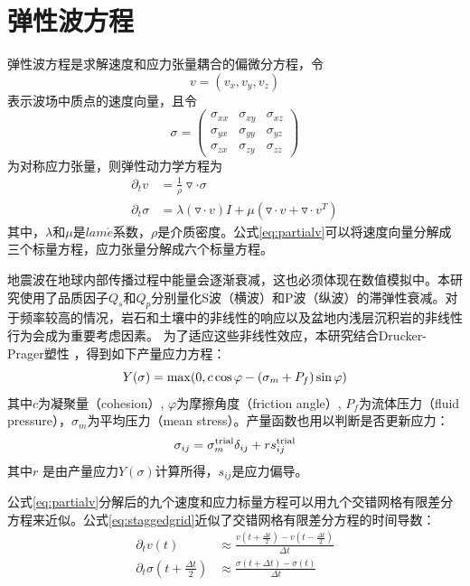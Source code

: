 \documentclass[degree=doctor]{thuthesis}
\begin{document}
\section{弹性波方程}
弹性波方程是求解速度和应力张量耦合的偏微分方程，令
\begin{equation}
  v = (v_x, v_y, v_z)
  \label{eq:vvvv}
\end{equation}
表示波场中质点的速度向量，且令
\begin{equation}
  \sigma = \begin{pmatrix}
\sigma_{xx} & \sigma_{xy} & \sigma_{xz} \\
\sigma_{yx} & \sigma_{yy} & \sigma_{yz} \\
\sigma_{zx} & \sigma_{zy} & \sigma_{zz}
\end{pmatrix}
\end{equation}
为对称应力张量，则弹性动力学方程为
\begin{equation}
\begin{aligned}
\partial _t v &= \frac{1}{\rho}\triangledown \cdot \sigma  \\
\partial _{t}\sigma &= \lambda(\triangledown \cdot v)I + \mu(\triangledown \cdot v + \triangledown \cdot v^T)
\end{aligned}
  \label{eq:partialv}
\end{equation}
其中，$\lambda$和$\mu$是$lam\acute{e}$系数，$\rho$是介质密度。公式\ref{eq:partialv}可以将速度向量分解成三个标量方程，应力张量分解成六个标量方程。

地震波在地球内部传播过程中能量会逐渐衰减，这也必须体现在数值模拟中。本研究使用了品质因子$Q_s$和$Q_p$分别量化S波（横波）和P波（纵波）的滞弹性衰减。对于频率较高的情况，岩石和土壤中的非线性的响应以及盆地内浅层沉积岩的非线性行为会成为重要考虑因素。 为了适应这些非线性效应，本研究结合Drucker-Prager塑性 \citep {roten2016high}，得到如下产量应力方程：
\begin{equation}
Y(\sigma)={\rm max}(0, c \cos \varphi - ( \sigma_{m} + P_{f} ) \sin\varphi)
\end{equation}
其中$c$为凝聚量（cohesion）, $\varphi$为摩擦角度（friction angle）, $P_{f}$为流体压力（fluid
pressure），$\sigma_{m}$为平均压力（mean stress）。产量函数也用以判断是否更新应力：
\begin{equation}
\sigma_{ij} = \sigma_{m}^{\rm trial} \delta_{ij} + r s_{ij}^{\rm{trial}}
\end{equation}
其中$r$ 是由产量应力$Y(\sigma)$计算所得，$s_{ij}$是应力偏导。

公式\ref{eq:partialv}分解后的九个速度和应力标量方程可以用九个交错网格有限差分方程来近似。公式\ref{eq:staggedgrid}近似了交错网格有限差分方程的时间导数：
\begin{equation}
\begin{aligned}
  \partial_tv(t) &\approx \frac{v(t+\frac{\Delta t}{2})- v(t-\frac{\Delta t}{2})}{\Delta t} \\
\partial_{t} \sigma(t+\frac{\Delta t}{2}) &\approx \frac{\sigma(t+\Delta t) - \sigma(t)}{\Delta t}
\end{aligned}
  \label{eq:staggedgrid}
\end{equation}
\end{document}
